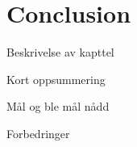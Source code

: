 \chapter{Conclusion}
\label{ch:conclusion}
Beskrivelse av kapttel

Kort oppsummering

Mål og ble mål nådd

Forbedringer
